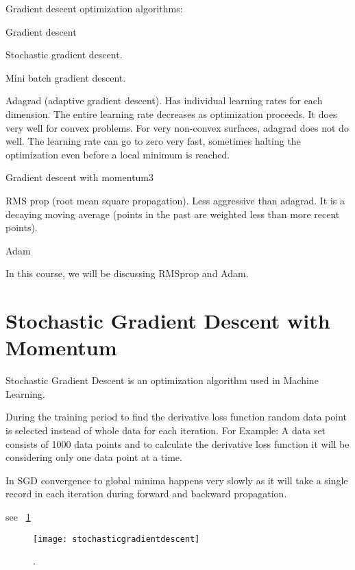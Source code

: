 Gradient descent optimization algorithms:
	\begin{bulletedlist}
		\item Gradient descent
		\item Stochastic gradient descent.
		\item Mini batch gradient descent.
		\item Adagrad (adaptive gradient descent).  Has individual learning rates for each dimension.  The entire learning rate decreases as optimization proceeds.  It does very well for convex problems.  For very non-convex surfaces, adagrad does not do well.  The learning rate can go to zero very fast, sometimes halting the optimization even before a local minimum is reached.
		\item Gradient descent with momentum3
		\item RMS prop (root mean square propagation).  Less aggressive than adagrad.  It is a decaying moving average (points in the past are weighted less than more recent points).
		\item Adam
	\end{bulletedlist}

In this course, we will be discussing RMSprop and Adam.

	\section{Stochastic Gradient Descent with Momentum}

	\begin{bulletedlist}
		\item Stochastic Gradient Descent is an optimization algorithm used in Machine Learning.
		\item During the training period to find the derivative loss function random data point is selected instead of whole data for each iteration.  For Example: A data set consists of 1000 data points and to calculate the derivative loss function it will be considering only one data point at a time.
		\item In SGD convergence to global minima happens very slowly as it will take a single record in each iteration during forward and backward propagation.
	\end{bulletedlist}
see \figurename~\ref{fig:stochasticgradientdescent}
 	\begin{figure}[h]
		\centering
		\texttt{[image: stochasticgradientdescent]}
		\caption{.}
		\label{fig:stochasticgradientdescent}
	\end{figure}

